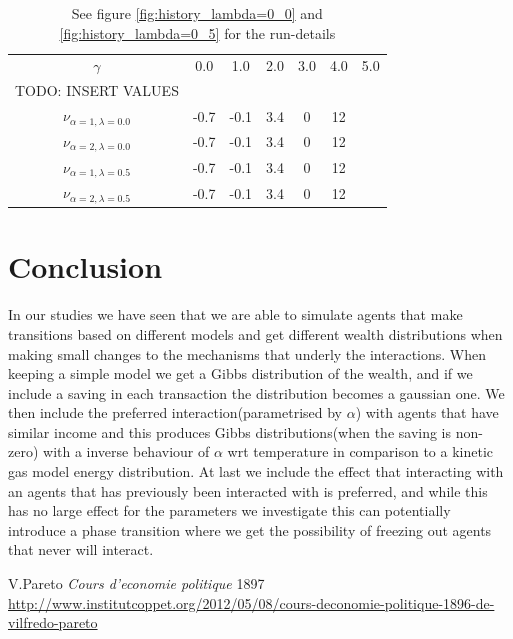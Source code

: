 \documentclass[a4paper,11pt]{article}
\begin{document}
{\begin{table}[h]
\caption{See figure \ref{fig:history_lambda=0_0} and \ref{fig:history_lambda=0_5} for the run-details}
\begin{center}
\begin{tabular}{c|c|c|c|c|c|c}
$\gamma$ & 0.0 & 1.0 & 2.0 & 3.0 & 4.0 & 5.0 \\
TODO: INSERT VALUES \\
$\nu_{\alpha=1, \lambda=0.0}$ & -0.7 & -0.1 & 3.4 & 0 & 12\\
$\nu_{\alpha=2, \lambda=0.0}$ & -0.7 & -0.1 & 3.4 & 0 & 12\\
$\nu_{\alpha=1, \lambda=0.5}$ & -0.7 & -0.1 & 3.4 & 0 &12  \\
$\nu_{\alpha=2, \lambda=0.5}$ & -0.7 & -0.1 & 3.4 & 0 & 12
\end{tabular}
\end{center}
\label{tab:hist}
\end{table}%




\section*{Conclusion}
In our studies we have seen that we are able to simulate agents that make transitions based on different models and get different wealth distributions when making small changes to the mechanisms that underly the interactions. When keeping a simple model we get a Gibbs distribution of the wealth, and if we include a saving in each transaction the distribution becomes a gaussian one. We then include the preferred interaction(parametrised by $\alpha$) with agents that have similar income and this produces Gibbs distributions(when the saving is non-zero) with a inverse behaviour of $\alpha$ wrt temperature in comparison to a kinetic gas model energy distribution. At last we include the effect that interacting with an agents that has previously been interacted with is preferred, and while this has no large effect for the parameters we investigate this can potentially introduce a phase transition where we get the possibility of freezing out agents that never will interact. 







\begin{thebibliography}{3}
			
	V.Pareto
	\emph{Cours d'economie politique}
	1897
	\url{http://www.institutcoppet.org/2012/05/08/cours-deconomie-politique-1896-de-vilfredo-pareto}
	

\end{thebibliography}}
\end{document}
